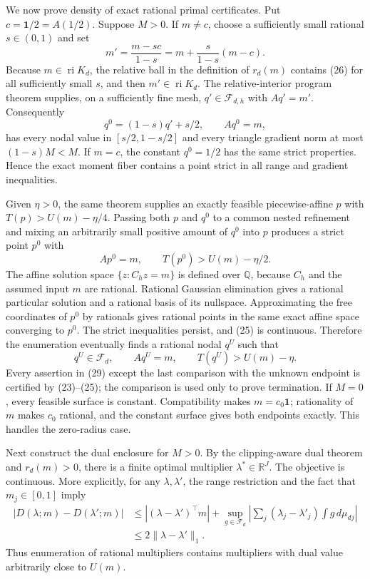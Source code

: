 We now prove density of exact rational primal certificates.  Put
\(c=\mathbf1/2=A(1/2)\).  Suppose \(M>0\).  If \(m\ne c\), choose a sufficiently
small rational \(s\in(0,1)\) and set
\[
 m'=\frac{m-sc}{1-s}
    =m+\frac{s}{1-s}(m-c).                                  \tag{26}
\]
Because \(m\in\operatorname{ri}K_d\), the relative ball in the definition of
\(r_d(m)\) contains (26) for all sufficiently small \(s\), and then
\(m'\in\operatorname{ri}K_d\).  The relative-interior program theorem supplies,
on a sufficiently fine mesh, \(q'\in\mathcal F_{d,h}\) with \(Aq'=m'\).
Consequently
\[
 q^0=(1-s)q'+s/2,
 \qquad Aq^0=m,                                              \tag{27}
\]
has every nodal value in \([s/2,1-s/2]\) and every triangle gradient norm at
most \((1-s)M<M\).  If \(m=c\), the constant \(q^0=1/2\) has the same strict
properties.  Hence the exact moment fiber contains a point strict in all range
and gradient inequalities.

Given \(\eta>0\), the same theorem supplies an exactly feasible
piecewise-affine \(p\) with \(T(p)>U(m)-\eta/4\).  Passing both \(p\) and
\(q^0\) to a common nested refinement and mixing an arbitrarily small positive
amount of \(q^0\) into \(p\) produces a strict point \(p^0\) with
\[
 Ap^0=m,
 \qquad T(p^0)>U(m)-\eta/2.                                 \tag{28}
\]
The affine solution space \(\{z:C_hz=m\}\) is defined over \(\mathbb Q\),
because \(C_h\) and the assumed input \(m\) are rational.  Rational Gaussian
elimination gives a rational particular solution and a rational basis of its
nullspace.  Approximating the free coordinates of \(p^0\) by rationals gives
rational points in the same exact affine space converging to \(p^0\).  The
strict inequalities persist, and (25) is continuous.  Therefore the
enumeration eventually finds a rational nodal \(q^U\) such that
\[
 q^U\in\mathcal F_d,
 \qquad Aq^U=m,
 \qquad T(q^U)>U(m)-\eta.                                   \tag{29}
\]
Every assertion in (29) except the last comparison with the unknown endpoint
is certified by (23)--(25); the comparison is used only to prove termination.
If \(M=0\), every feasible surface is constant.  Compatibility makes
\(m=c_0\mathbf1\); rationality of \(m\) makes \(c_0\) rational, and the constant
surface gives both endpoints exactly.  This handles the zero-radius case.

Next construct the dual enclosure for \(M>0\).  By the clipping-aware dual
theorem and \(r_d(m)>0\), there is a finite optimal multiplier
\(\lambda^*\in\mathbb R^J\).  The objective is continuous.  More explicitly,
for any \(\lambda,\lambda'\), the range restriction and the fact that
\(m_j\in[0,1]\) imply
\begin{align}
 |D(\lambda;m)-D(\lambda';m)|
 &\le |(\lambda-\lambda')^\top m|
   +\sup_{g\in\mathcal F_d}
       \left|\sum_j(\lambda_j-\lambda'_j)\int g\,d\mu_{dj}\right|\\
 &\le2\|\lambda-\lambda'\|_1.                              \tag{30}
\end{align}
Thus enumeration of rational multipliers contains multipliers with dual value
arbitrarily close to \(U(m)\).

